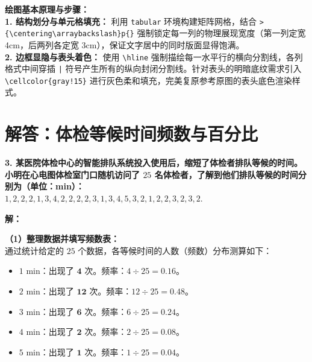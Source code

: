 \vspace{0.6cm}

{\small\color{blue!70!black}
\textbf{绘图基本原理与步骤：}\\
\textbf{1. 结构划分与单元格填充：} 利用 \texttt{tabular} 环境构建矩阵网格，结合 \texttt{>\{\textbackslash centering\textbackslash arraybackslash\}p\{\}} 强制锁定每一列的物理展现宽度（第一列定宽 4cm，后两列各定宽 3cm），保证文字居中的同时版面显得饱满。\\
\textbf{2. 边框显隐与表头着色：} 使用 \texttt{\textbackslash hline} 强制描绘每一水平行的横向分割线，各列格式中间穿插 \texttt{|} 符号产生所有的纵向封闭分割线。针对表头的明暗底纹需求引入 \texttt{\textbackslash cellcolor\{gray!15\}} 进行灰色柔和填充，完美复原参考原图的表头底色渲染样式。
}

\newpage



\section{解答：体检等候时间频数与百分比}

\vspace{0.6cm}

\textbf{3. 某医院体检中心的智能排队系统投入使用后，缩短了体检者排队等候的时间。小明在心电图体检室门口随机访问了 $25$ 名体检者，了解到他们排队等候的时间分别为（单位：min）：\\
$1, 2, 2, 2, 1, 3, 4, 2, 2, 2, 2, 3, 1, 3, 4, 5, 3, 2, 1, 2, 2, 3, 2, 3, 2.$}

\vspace{0.4cm}

\textbf{解：}

\textbf{（1）整理数据并填写频数表：} \\
通过统计给定的 $25$ 个数据，各等候时间的人数（频数）分布测算如下：
\begin{itemize}
  \item \textbf{$1\text{ min}$}：出现了 $\boldsymbol{4}$ 次。频率：$4 \div 25 = \boldsymbol{0.16}$。
  \item \textbf{$2\text{ min}$}：出现了 $\boldsymbol{12}$ 次。频率：$12 \div 25 = \boldsymbol{0.48}$。
  \item \textbf{$3\text{ min}$}：出现了 $\boldsymbol{6}$ 次。频率：$6 \div 25 = \boldsymbol{0.24}$。
  \item \textbf{$4\text{ min}$}：出现了 $\boldsymbol{2}$ 次。频率：$2 \div 25 = \boldsymbol{0.08}$。
  \item \textbf{$5\text{ min}$}：出现了 $\boldsymbol{1}$ 次。频率：$1 \div 25 = \boldsymbol{0.04}$。
\end{itemize}

